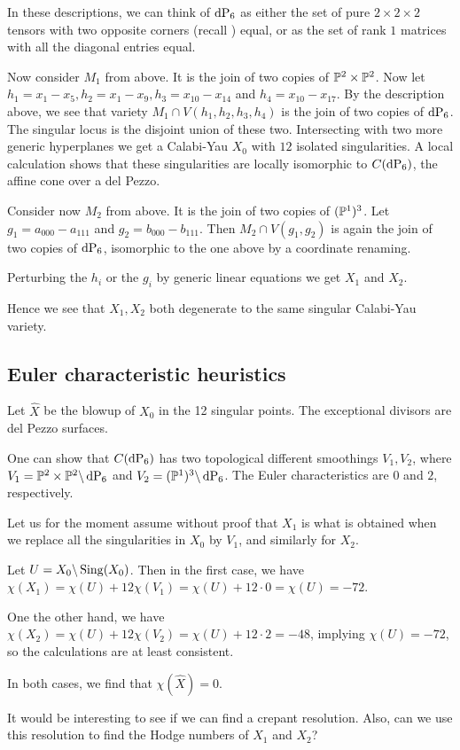 \documentclass[11pt, english]{article}
\begin{document}
In these descriptions, we can think of $\dP6$ as either the set of pure $2 \times 2 \times 2$ tensors with two opposite corners (recall ) equal, or as the set of rank $1$ matrices with all the diagonal entries equal.

Now consider $M_1$ from above. It is the join of two copies of $\mathbb{P}^2 \times \mathbb{P}^2$. Now let $h_1=x_1-x_5,h_2=x_1-x_9,h_3=x_{10}-x_{14}$ and $h_4=x_{10}-x_{17}$. By the description above, we see that variety $M_1 \cap V(h_1,h_2,h_3,h_4)$ is the join of two copies of $\dP6$. The singular locus is the disjoint union of these two. Intersecting with two more generic hyperplanes we get a Calabi-Yau $X_0$ with $12$ isolated singularities. A local calculation shows that these singularities are locally isomorphic to $C(\dP6)$, the affine cone over a del Pezzo. 

Consider now $M_2$ from above. It is the join of two copies of $(\mathbb{P}^1)^3$. Let $g_1=a_{000}-a_{111}$ and $g_2=b_{000}-b_{111}$. Then $M_2 \cap V(g_1,g_2)$ is again the join of two copies of $\dP6$, isomorphic to the one above by a coordinate renaming.

Perturbing the $h_i$ or the $g_i$ by generic linear equations we get $X_1$ and $X_2$.

Hence we see that $X_1,X_2$ both degenerate to the same singular Calabi-Yau variety.

\subsection{Euler characteristic heuristics}

Let $\hat X$ be the blowup of $X_0$ in the 12 singular points. The exceptional divisors are del Pezzo surfaces. 

One can show that $C(\dP6)$ has two topological different smoothings $V_1,V_2$, where $V_1 = \PP^2 \times \PP^2 \bs \dP6$ and $V_2=(\PP^1)^3 \bs \dP6$. The Euler characteristics are $0$ and $2$, respectively.

Let us for the moment assume without proof that $X_1$ is what is obtained when we replace all the singularities in $X_0$ by $V_1$, and similarly for $X_2$.

Let $U = X_0 \backslash \operatorname{Sing}(X_0)$. Then in the first case, we have $\chi(X_1)=\chi(U)+12\chi(V_1)=\chi(U)+12\cdot 0 = \chi(U)=-72$. 

One the other hand, we have $\chi(X_2)=\chi(U)+12\chi(V_2)=\chi(U)+12\cdot 2 =-48$, implying $\chi(U)=-72$, so the calculations are at least consistent.

In both cases, we find that $\chi(\hat X)=0$.

It would be interesting to see if we can find a crepant resolution. Also, can we use this resolution to find the Hodge numbers of $X_1$ and $X_2$?
\end{document}
